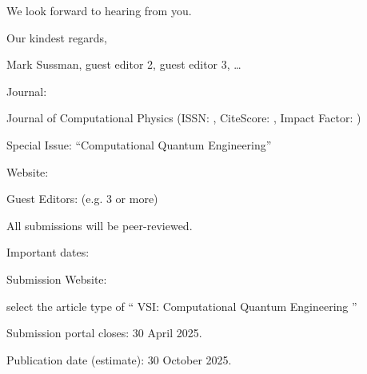 \documentclass[]{article}
\begin{document}
\par\noindent
We look forward to hearing from you. \\
\par\noindent

Our kindest regards, \\
\par\noindent

Mark Sussman, guest editor 2, guest editor 3, \ldots \\
\par\noindent

Journal:
\par\noindent

Journal of Computational Physics (ISSN: , CiteScore: , Impact Factor: ) \\
\par\noindent

Special Issue: ``Computational Quantum Engineering''
\par\noindent

Website: 
\par\noindent

Guest Editors: (e.g. 3 or more)
\par\noindent

All submissions will be peer-reviewed.
\par\noindent

Important dates:
\par\noindent

Submission Website: 
\par\noindent
select the article type of `` VSI: Computational Quantum Engineering '' 
\par\noindent

Submission portal closes: 30 April 2025.
\par\noindent

Publication date (estimate): 30 October 2025.
\par\noindent



\end{document}
